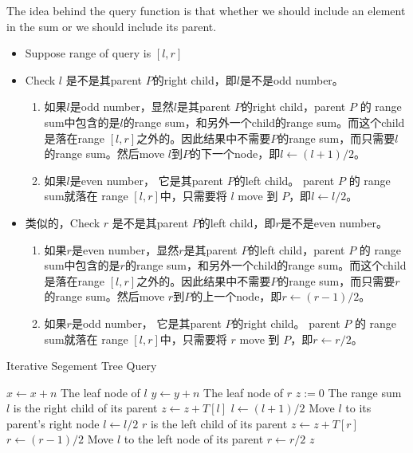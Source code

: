 The idea behind the query function is that whether we should include an element in the sum or we should include its parent.
\begin{itemize}
\item Suppose range of query is $ [l, r] $
\item Check $l$ 是不是其parent $ P $的right child，即$l$是不是odd number。
\begin{enumerate}
\item 如果$l$是odd number，显然$l$是其parent $ P $的right child，parent $ P $ 的
range sum中包含的是$ l $的range sum，和另外一个child的range sum。而这个child 是落在range $ [l,r] $之外的。因此结果中不需要$P$的range sum，而只需要$l$的range sum。然后move $ l $到$P$的下一个node，即$l\gets (l+1)/2$。
\item 如果$ l $是even number， 它是其parent $ P $的left child。 parent $ P $ 的 range sum就落在 range $[l,r]$中，只需要将 $ l $ move 到 $ P $，即$l\gets l/2$。
\end{enumerate}
\item 类似的，Check $r$ 是不是其parent $ P $的left child，即$r$是不是even number。
\begin{enumerate}
\item 如果$r$是even number，显然$r$是其parent $ P $的left child，parent $ P $ 的
range sum中包含的是$ r $的range sum，和另外一个child的range sum。而这个child 是落在range $ [l,r] $之外的。因此结果中不需要$P$的range sum，而只需要$r$的range sum。然后move $ r $到$P$的上一个node，即$r\gets (r-1)/2$。
\item 如果$ r $是odd number， 它是其parent $ P $的right child。 parent $ P $ 的 range sum就落在 range $[l,r]$中，只需要将 $ r $ move 到 $ P $，即$r\gets r/2$。
\end{enumerate}
\end{itemize}
\begin{algorithm}[H]
\caption{Iterative Segement Tree Query}
\begin{algorithmic}[1]
\State $x\gets x+n$ \Comment The leaf node of $l$
\State $y\gets y+n$ \Comment The leaf node of $r$
\State $z:=0$ \Comment The range sum
 \Comment $l$ is the right child of its parent
\State $z\gets z + T[l]$
\State $l\gets (l+1)/2$ \Comment Move $l$ to its parent's right node
\Else
\State $l\gets l/2$
\EndIf
{} \Comment $r$ is the left child of its parent
\State $z\gets z + T[r]$
\State $r\gets (r-1)/2$ \Comment Move $l$ to the left node of its parent
\Else
\State $r\gets r/2$
\EndIf
\EndWhile
\State \Return $ z $
\EndProcedure
\end{algorithmic}
\end{algorithm}
